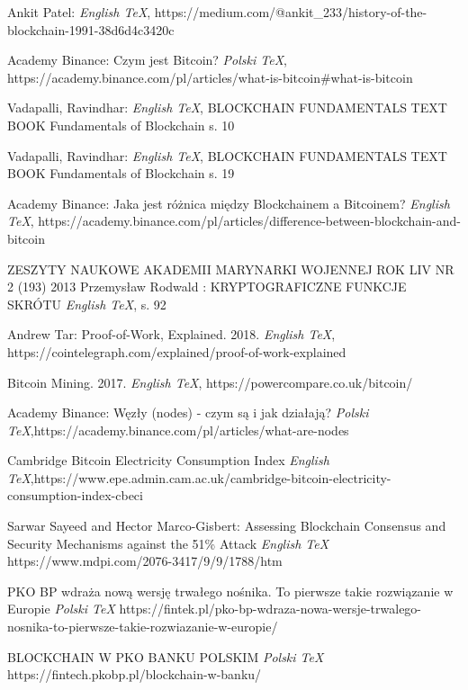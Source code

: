 \documentclass[a4paper,12pt]{book}
\begin{document}
\begin{thebibliography}{99}
 Ankit Patel:
\emph{English \TeX},
https://medium.com/@ankit\_233/history-of-the-blockchain-1991-38d6d4c3420c

 Academy Binance: Czym jest Bitcoin?
\emph{Polski \TeX},
https://academy.binance.com/pl/articles/what-is-bitcoin\#what-is-bitcoin

 Vadapalli, Ravindhar:
\emph{English \TeX},
BLOCKCHAIN FUNDAMENTALS TEXT BOOK Fundamentals of Blockchain s. 10

 Vadapalli, Ravindhar:
\emph{English \TeX},
BLOCKCHAIN FUNDAMENTALS TEXT BOOK Fundamentals of Blockchain s. 19

 Academy Binance: Jaka jest różnica między Blockchainem a Bitcoinem?
\emph{English \TeX},
https://academy.binance.com/pl/articles/difference-between-blockchain-and-bitcoin

 ZESZYTY NAUKOWE AKADEMII MARYNARKI WOJENNEJ
ROK LIV NR 2 (193) 2013  Przemysław Rodwald : KRYPTOGRAFICZNE FUNKCJE SKRÓTU
\emph{English \TeX},
 s. 92

 Andrew Tar: Proof-of-Work, Explained. 2018.
\emph{English \TeX},  https://cointelegraph.com/explained/proof-of-work-explained

 Bitcoin Mining. 2017. 
\emph{English \TeX}, https://powercompare.co.uk/bitcoin/

 Academy Binance: Węzły (nodes) - czym są i jak działają?
\emph{Polski \TeX},https://academy.binance.com/pl/articles/what-are-nodes

 Cambridge Bitcoin Electricity Consumption Index
\emph{English \TeX},https://www.epe.admin.cam.ac.uk/cambridge-bitcoin-electricity-consumption-index-cbeci

 Sarwar Sayeed and Hector Marco-Gisbert: Assessing Blockchain Consensus and Security Mechanisms against the 51\% Attack
\emph{English \TeX} https://www.mdpi.com/2076-3417/9/9/1788/htm

 PKO BP wdraża nową wersję trwałego nośnika. To pierwsze takie rozwiązanie w Europie
\emph{Polski \TeX} https://fintek.pl/pko-bp-wdraza-nowa-wersje-trwalego-nosnika-to-pierwsze-takie-rozwiazanie-w-europie/

BLOCKCHAIN W PKO BANKU POLSKIM
\emph{Polski \TeX} https://fintech.pkobp.pl/blockchain-w-banku/


\end{thebibliography}
\end{document}
